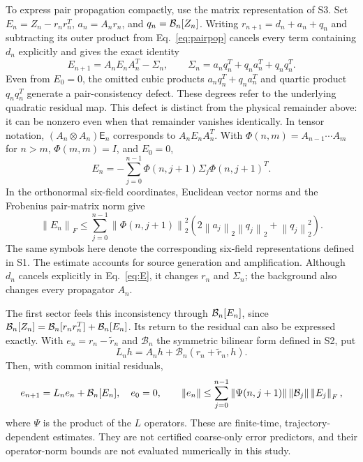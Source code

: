 \documentclass[10pt,letterpaper]{article}
\newcommand{\fld}[1]{\mathsf{#1}}
\newcommand{\norm}[1]{\left\lVert#1\right\rVert}
\begin{document}
To express pair propagation compactly, use the matrix representation of S3. Set $E_n=Z_n-r_nr_n^T$, $a_n=A_nr_n$, and $q_n=\mathcal B_n[Z_n]$. Writing $r_{n+1}=d_n+a_n+q_n$ and subtracting its outer product from Eq.~\eqref{eq:pairpop} cancels every term containing $d_n$ explicitly and gives the exact identity
\begin{equation}
 E_{n+1}=A_nE_nA_n^T-\Sigma_n,\qquad
 \Sigma_n=a_nq_n^T+q_na_n^T+q_nq_n^T.
 \label{eq:E}
\end{equation}
Even from $E_0=0$, the omitted cubic products $a_nq_n^T+q_na_n^T$ and quartic product $q_nq_n^T$ generate a pair-consistency defect. These degrees refer to the underlying quadratic residual map. This defect is distinct from the physical remainder above: it can be nonzero even when that remainder vanishes identically. In tensor notation, $(A_n\otimes A_n)\fld E_n$ corresponds to $A_nE_nA_n^T$. With $\Phi(n,m)=A_{n-1}\cdots A_m$ for $n>m$, $\Phi(m,m)=I$, and $E_0=0$,
\begin{equation}
 E_n=-\sum_{j=0}^{n-1}\Phi(n,j+1)\Sigma_j\Phi(n,j+1)^T.
 \label{eq:duhamel}
\end{equation}
In the orthonormal six-field coordinates, Euclidean vector norms and the Frobenius pair-matrix norm give
\begin{equation}
 \norm{E_n}_F\leq\sum_{j=0}^{n-1}\norm{\Phi(n,j+1)}_2^2
 \left(2\norm{a_j}_2\norm{q_j}_2+\norm{q_j}_2^2\right).
\end{equation}
The same symbols here denote the corresponding six-field representations defined in S1. The estimate accounts for source generation and amplification. Although $d_n$ cancels explicitly in Eq.~\eqref{eq:E}, it changes $r_n$ and $\Sigma_n$; the background also changes every propagator $A_n$.

The first sector feels this inconsistency through $\mathcal B_n[E_n]$, since $\mathcal B_n[Z_n]=\mathcal B_n[r_nr_n^T]+\mathcal B_n[E_n]$. Its return to the residual can also be expressed exactly. With $e_n=r_n-\tilde r_n$ and $\mathcal B_n$ the symmetric bilinear form defined in S2, put
\begin{equation}
 L_nh=A_nh+\mathcal B_n(r_n+\tilde r_n,h).
\end{equation}
Then, with common initial residuals,
\begin{equation}
 e_{n+1}=L_ne_n+\B_n[E_n],\quad e_0=0,\qquad
 \norm{e_n}\leq\sum_{j=0}^{n-1}\norm{\Psi(n,j+1)}\norm{\B_j}\norm{E_j}_F,
\end{equation}
where $\Psi$ is the product of the $L$ operators. These are finite-time, trajectory-dependent estimates. They are not certified coarse-only error predictors, and their operator-norm bounds are not evaluated numerically in this study.
\end{document}
